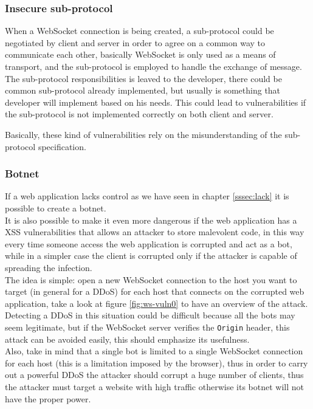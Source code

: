 	\subsubsection{Insecure sub-protocol}
	When a WebSocket connection is being created, a sub-protocol could be negotiated by client and server in order to agree on a common way to communicate each other, basically WebSocket is only used as a means of transport, and the sub-protocol is employed to handle the exchange of message.\newline
	The sub-protocol responsibilities is leaved to the developer, there could be common sub-protocol already implemented, but usually is something that developer will implement based on his needs.\newline
	This could lead to vulnerabilities if the sub-protocol is not implemented correctly on both client and server.\newline
	
	Basically, these kind of vulnerabilities rely on the misunderstanding of the sub-protocol specification.
	
	\subsubsection{Botnet}
	If a web application lacks control as we have seen in chapter \ref{sssec:lack} it is possible to create a botnet.\\
	It is also possible to make it even more dangerous if the web application has a XSS vulnerabilities that
	allows an attacker to store malevolent code, in this way every time someone access the web application
	is corrupted and act as a bot, while in a simpler case the client is corrupted only if the attacker
	is capable of spreading the infection.\\
	
	The idea is simple: open a new WebSocket connection to the host you want to target (in general for a DDoS) for
	each host that connects on the corrupted web application, take a look at figure \ref{fig:ws-vuln0} to have
	an overview of the attack.\\
	
	Detecting a DDoS in this situation could be difficult because all the bots may seem legitimate,
	but if the WebSocket server verifies the \texttt{Origin} header, this attack can be avoided easily,
	this should emphasize its usefulness.\\
	Also, take in mind that a single bot is limited to a single WebSocket connection for each host (this is a limitation imposed by the browser), thus
	in order to carry out a powerful DDoS the attacker should corrupt a huge number of clients, thus the attacker
	must target a website with high traffic otherwise its botnet will not have the proper power.\\
	

